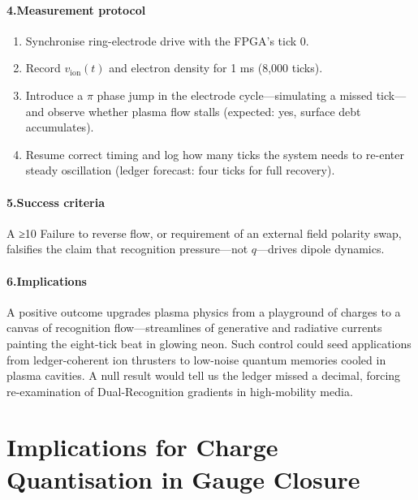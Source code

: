 \documentclass[11pt,oneside]{book}
\begin{document}
\paragraph*{4.\;Measurement protocol}

\begin{enumerate}
\item Synchronise ring-electrode drive with the FPGA’s tick 0.
\item Record $v_{\text{ion}}(t)$ and electron density for 1 ms (8,000 ticks).
\item Introduce a $\pi$ phase jump in the electrode cycle—simulating a missed tick—and observe whether plasma flow stalls (expected: yes, surface debt accumulates).
\item Resume correct timing and log how many ticks the system needs to re-enter steady oscillation (ledger forecast: four ticks for full recovery).
\end{enumerate}

\paragraph*{5.\;Success criteria}

A ≥10 %
Failure to reverse flow, or requirement of an external field polarity swap, falsifies the claim that recognition pressure—not $q$—drives dipole dynamics.

\paragraph*{6.\;Implications}

A positive outcome upgrades plasma physics from a playground of charges to a canvas of recognition flow—streamlines of generative and radiative currents painting the eight-tick beat in glowing neon.  
Such control could seed applications from ledger-coherent ion thrusters to low-noise quantum memories cooled in plasma cavities.  
A null result would tell us the ledger missed a decimal, forcing re-examination of Dual-Recognition gradients in high-mobility media.

\section{Implications for Charge Quantisation in Gauge Closure}
\label{sec:charge-quantisation}
\end{document}
